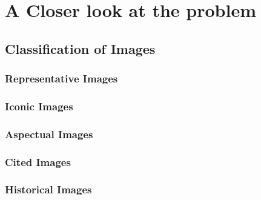 \chapter{ A Closer look at the problem }

\section{Classification of Images}

\subsection{Representative Images}

\subsection{Iconic Images}

\subsection{Aspectual Images}

\subsection{Cited Images}

\subsection{Historical Images}
